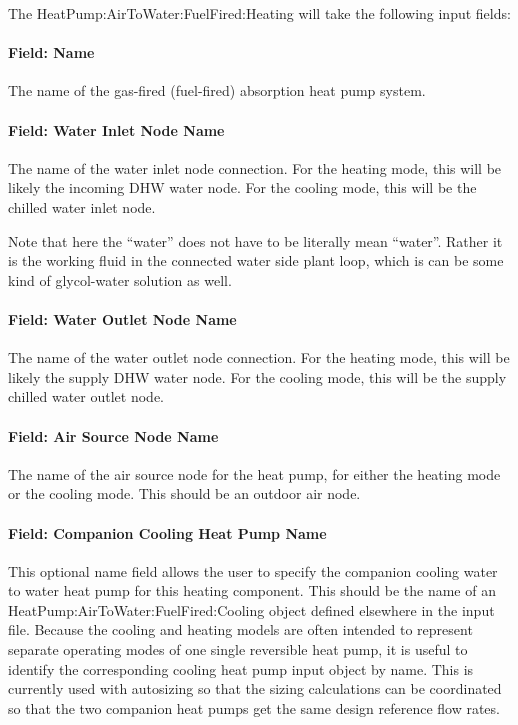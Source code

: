 The HeatPump:AirToWater:FuelFired:Heating will take the following input fields:

\paragraph{Field: Name}
The name of the gas-fired (fuel-fired) absorption heat pump system.

\paragraph{Field: Water Inlet Node Name}

The name of the water inlet node connection. For the heating mode, this will be likely the incoming DHW water node. For the cooling mode, this will be the chilled water inlet node.

Note that here the ``water'' does not have to be literally mean ``water''. Rather it is the working fluid in the connected water side plant loop, which is can be some kind of glycol-water solution as well.

\paragraph{Field: Water Outlet Node Name}
The name of the water outlet node connection. For the heating mode, this will be likely the supply DHW water node. For the cooling mode, this will be the supply chilled water outlet node.

\paragraph{Field: Air Source Node Name}
The name of the air source node for the heat pump, for either the heating mode or the cooling mode. This should be an outdoor air node.

\paragraph{Field: Companion Cooling Heat Pump Name}

This optional name field allows the user to specify the companion cooling water to water heat pump for this heating component. This should be the name of an HeatPump:AirToWater:FuelFired:Cooling object defined elsewhere in the input file. Because the cooling and heating models are often intended to represent separate operating modes of one single reversible heat pump, it is useful to identify the corresponding cooling heat pump input object by name. This is currently used with autosizing so that the sizing calculations can be coordinated so that the two companion heat pumps get the same design reference flow rates.

